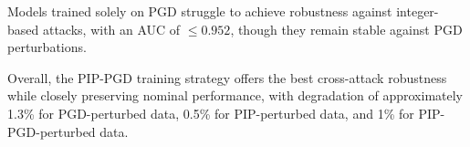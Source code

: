Models trained solely on PGD struggle to achieve robustness against integer-based attacks, with an AUC of  $\le0.952$, though they remain stable against PGD perturbations.

Overall, the PIP-PGD training strategy offers the best cross-attack robustness while closely preserving nominal performance, with degradation of approximately 1.3\% for PGD-perturbed data, 0.5\% for PIP-perturbed data, and 1\% for PIP-PGD-perturbed data.